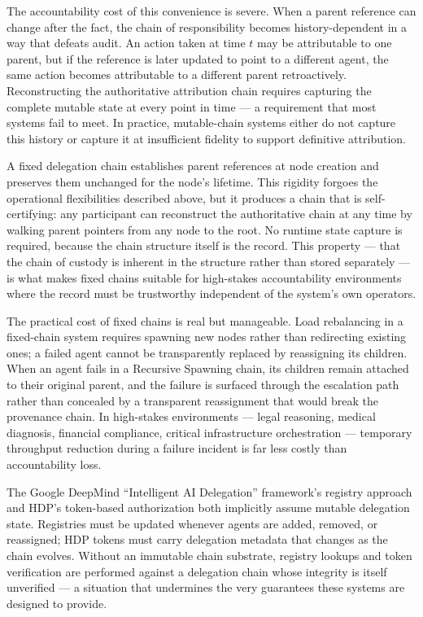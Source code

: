 The accountability cost of this convenience is severe.  When a parent reference can change after the fact, the chain of responsibility becomes history-dependent in a way that defeats audit.  An action taken at time $t$ may be attributable to one parent, but if the reference is later updated to point to a different agent, the same action becomes attributable to a different parent retroactively.  Reconstructing the authoritative attribution chain requires capturing the complete mutable state at every point in time --- a requirement that most systems fail to meet.  In practice, mutable-chain systems either do not capture this history or capture it at insufficient fidelity to support definitive attribution.

A fixed delegation chain establishes parent references at node creation and preserves them unchanged for the node's lifetime.  This rigidity forgoes the operational flexibilities described above, but it produces a chain that is self-certifying: any participant can reconstruct the authoritative chain at any time by walking parent pointers from any node to the root.  No runtime state capture is required, because the chain structure itself is the record.  This property --- that the chain of custody is inherent in the structure rather than stored separately --- is what makes fixed chains suitable for high-stakes accountability environments where the record must be trustworthy independent of the system's own operators.

The practical cost of fixed chains is real but manageable.  Load rebalancing in a fixed-chain system requires spawning new nodes rather than redirecting existing ones; a failed agent cannot be transparently replaced by reassigning its children.  When an agent fails in a Recursive Spawning chain, its children remain attached to their original parent, and the failure is surfaced through the escalation path rather than concealed by a transparent reassignment that would break the provenance chain.  In high-stakes environments --- legal reasoning, medical diagnosis, financial compliance, critical infrastructure orchestration --- temporary throughput reduction during a failure incident is far less costly than accountability loss.

The Google DeepMind ``Intelligent AI Delegation'' framework's registry approach \cite{intelligent_ai_delegation} and HDP's token-based authorization \cite{hdp2025arxiv,hdp2025ietf} both implicitly assume mutable delegation state.  Registries must be updated whenever agents are added, removed, or reassigned; HDP tokens must carry delegation metadata that changes as the chain evolves.  Without an immutable chain substrate, registry lookups and token verification are performed against a delegation chain whose integrity is itself unverified --- a situation that undermines the very guarantees these systems are designed to provide.

